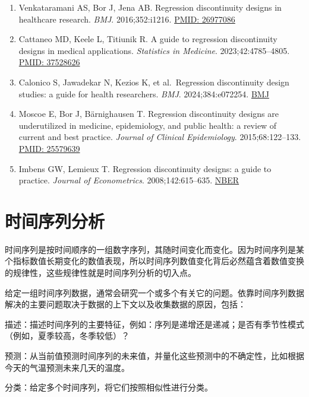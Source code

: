\documentclass[
  chinese-hans,
  letterpaper,
  DIV=11,
  numbers=noendperiod]{scrreprt}
\providecommand{\tightlist}{%
  \setlength{\itemsep}{0pt}\setlength{\parskip}{0pt}}
\begin{document}
\begin{enumerate}
\def\labelenumi{\arabic{enumi}.}
\tightlist
\item
  Venkataramani AS, Bor J, Jena AB. Regression discontinuity designs in
  healthcare research. \emph{BMJ}. 2016;352:i1216.
  \href{https://pubmed.ncbi.nlm.nih.gov/26977086/}{PMID: 26977086}
\item
  Cattaneo MD, Keele L, Titiunik R. A guide to regression discontinuity
  designs in medical applications. \emph{Statistics in Medicine}.
  2023;42:4785--4805.
  \href{https://pubmed.ncbi.nlm.nih.gov/37528626/}{PMID: 37528626}
\item
  Calonico S, Jawadekar N, Kezios K, et al.~Regression discontinuity
  design studies: a guide for health researchers. \emph{BMJ}.
  2024;384:e072254.
  \href{https://www.bmj.com/content/384/bmj-2022-072254}{BMJ}
\item
  Moscoe E, Bor J, Bärnighausen T. Regression discontinuity designs are
  underutilized in medicine, epidemiology, and public health: a review
  of current and best practice. \emph{Journal of Clinical Epidemiology}.
  2015;68:122--133.
  \href{https://pubmed.ncbi.nlm.nih.gov/25579639/}{PMID: 25579639}
\item
  Imbens GW, Lemieux T. Regression discontinuity designs: a guide to
  practice. \emph{Journal of Econometrics}. 2008;142:615--635.
  \href{https://www.nber.org/papers/t0337}{NBER}
\end{enumerate}


\chapter{时间序列分析}\label{ux65f6ux95f4ux5e8fux5217ux5206ux6790}

时间序列是按时间顺序的一组数字序列，其随时间变化而变化。因为时间序列是某个指标数值长期变化的数值表现，所以时间序列数值变化背后必然蕴含着数值变换的规律性，这些规律性就是时间序列分析的切入点。

给定一组时间序列数据，通常会研究一个或多个有关它的问题。依靠时间序列数据解决的主要问题取决于数据的上下文以及收集数据的原因，包括：

描述：描述时间序列的主要特征，例如：序列是递增还是递减；是否有季节性模式（例如，夏季较高，冬季较低）？

预测：从当前值预测时间序列的未来值，并量化这些预测中的不确定性，比如根据今天的气温预测未来几天的温度。

分类：给定多个时间序列，将它们按照相似性进行分类。
\end{document}
